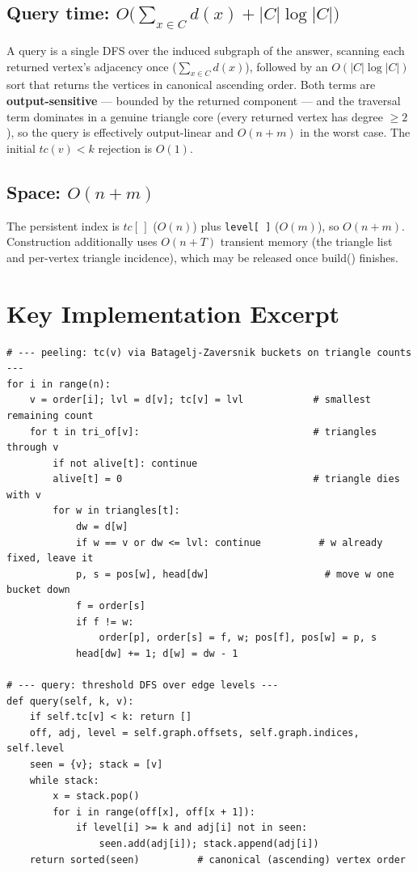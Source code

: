\documentclass[11pt]{article}
\begin{document}
\subsection{Query time: $O\!\Big(\sum_{x\in C} d(x)+|C|\log|C|\Big)$}
A query is a single DFS over the induced subgraph of the answer, scanning each
returned vertex's adjacency once ($\sum_{x\in C}d(x)$), followed by an
$O(|C|\log|C|)$ sort that returns the vertices in canonical ascending order. Both
terms are \textbf{output-sensitive} --- bounded by the returned component --- and
the traversal term dominates in a genuine triangle core (every returned vertex
has degree $\ge 2$), so the query is effectively output-linear and $O(n+m)$ in
the worst case. The initial $tc(v)<k$ rejection is $O(1)$.

\subsection{Space: $O(n+m)$}
The persistent index is $tc[\,]$ ($O(n)$) plus \texttt{level[\,]} ($O(m)$),
so $O(n+m)$. Construction additionally uses $O(n+T)$ transient memory (the
triangle list and per-vertex triangle incidence), which may be released once
\textsf{build()} finishes.

\section{Key Implementation Excerpt}
\begin{lstlisting}[style=py]
# --- peeling: tc(v) via Batagelj-Zaversnik buckets on triangle counts ---
for i in range(n):
    v = order[i]; lvl = d[v]; tc[v] = lvl            # smallest remaining count
    for t in tri_of[v]:                              # triangles through v
        if not alive[t]: continue
        alive[t] = 0                                 # triangle dies with v
        for w in triangles[t]:
            dw = d[w]
            if w == v or dw <= lvl: continue          # w already fixed, leave it
            p, s = pos[w], head[dw]                    # move w one bucket down
            f = order[s]
            if f != w:
                order[p], order[s] = f, w; pos[f], pos[w] = p, s
            head[dw] += 1; d[w] = dw - 1

# --- query: threshold DFS over edge levels ---
def query(self, k, v):
    if self.tc[v] < k: return []
    off, adj, level = self.graph.offsets, self.graph.indices, self.level
    seen = {v}; stack = [v]
    while stack:
        x = stack.pop()
        for i in range(off[x], off[x + 1]):
            if level[i] >= k and adj[i] not in seen:
                seen.add(adj[i]); stack.append(adj[i])
    return sorted(seen)          # canonical (ascending) vertex order
\end{lstlisting}
\end{document}
